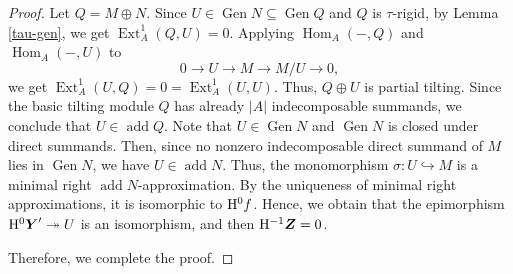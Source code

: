 \documentclass[reqno,12pt]{amsart}
\numberwithin{equation}{section}
\theoremstyle{plain}
\theoremstyle{definition}
\begin{document}
\begin{proof}
Let $Q=M\oplus N$. Since $U\in\operatorname{Gen}N\subseteq\operatorname{Gen}Q$ and $Q$ is
$\tau$-rigid, by Lemma \ref{tau-gen}, we get
$\operatorname{Ext}_A^1(Q,U)=0$. Applying $\operatorname{Hom}_A(-,Q)$ and
$\operatorname{Hom}_A(-,U)$ to
\[
0\longrightarrow U\longrightarrow M\longrightarrow M/U\longrightarrow0,
\]
we get $\operatorname{Ext}_A^1(U,Q)=0=\operatorname{Ext}_A^1(U,U)$. Thus, $Q\oplus U$
is partial tilting. Since the basic tilting module $Q$ has already $|A|$
indecomposable summands, we conclude that
$U\in\operatorname{add}Q$.
Note that $U\in\operatorname{Gen}N$ and $\operatorname{Gen}N$ is closed under direct summands.
Then, since no nonzero indecomposable direct summand of
$M$ lies in $\operatorname{Gen}N$, we have $U\in\operatorname{add}N$. Thus, the monomorphism
$\sigma:U\hookrightarrow M$ is a minimal right
$\operatorname{add}N$-approximation. By the uniqueness of minimal right
approximations, it is isomorphic to ${\rm H}^{0}f$. Hence, we obtain that the epimorphism
${\rm H}^{0}\boldsymbol{Y}'\twoheadrightarrow U$ is an isomorphism, and then ${\rm H}^{-1}\boldsymbol{Z}=0$.

Therefore, we complete the proof.
\end{proof}
\end{document}
